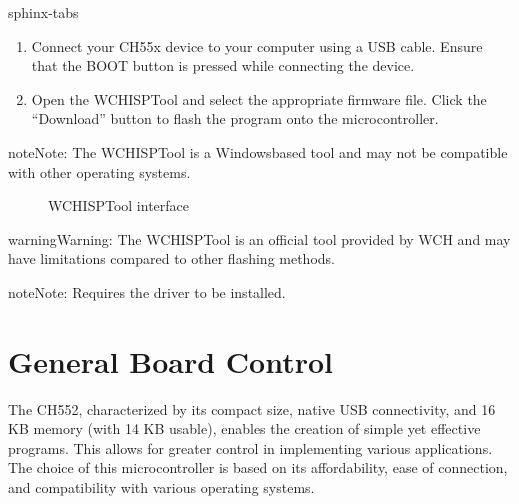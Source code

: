 \documentclass[letterpaper,10pt,english]{sphinxmanual}
\begin{document}
\begin{sphinxuseclass}{sphinx-tabs}
\begin{enumerate}
\sphinxAtStartPar
Install the WCHISPTool on your Windows computer by following the on\sphinxhyphen{}screen instructions.

\item {} 
\sphinxAtStartPar
{}

\sphinxAtStartPar
Connect your CH55x device to your computer using a USB cable. Ensure that the BOOT button is pressed while connecting the device.

\item {} 
\sphinxAtStartPar
{}

\sphinxAtStartPar
Open the WCHISPTool and select the appropriate firmware file. Click the “Download” button to flash the program onto the microcontroller.

\end{enumerate}

\begin{sphinxadmonition}{note}{Note:}
\sphinxAtStartPar
The WCHISPTool is a Windows\sphinxhyphen{}based tool and may not be compatible with other operating systems.
\end{sphinxadmonition}

\begin{figure}[htbp]
\centering
\capstart

\noindent{}
\caption{WCHISPTool interface}\label{\detokenize{compile:id21}}\label{\detokenize{compile:id16}}\end{figure}

\begin{sphinxadmonition}{warning}{Warning:}
\sphinxAtStartPar
The WCHISPTool is an official tool provided by WCH and may have limitations compared to other flashing methods.
\end{sphinxadmonition}

\begin{sphinxadmonition}{note}{Note:}
\sphinxAtStartPar
Requires the  driver to be installed.
\end{sphinxadmonition}

\end{sphinxuseclass}
\sphinxstepscope


\chapter{General Board Control}
\label{\detokenize{generalboardcontrol:general-board-control}}\label{\detokenize{generalboardcontrol::doc}}
\sphinxAtStartPar
The CH552, characterized by its compact size, native USB connectivity, and 16 KB memory (with 14 KB usable), enables the creation of simple yet effective programs. This allows for greater control in implementing various applications. The choice of this microcontroller is based on its affordability, ease of connection, and compatibility with various operating systems.
\end{document}
